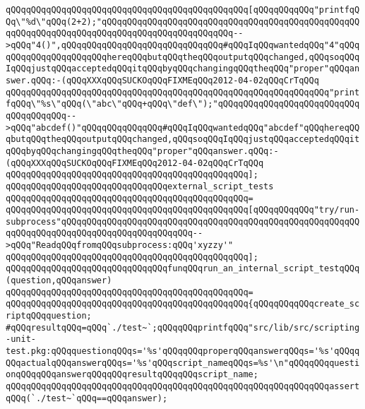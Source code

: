 \verb|qQQqqQQqqQQqqQQqqQQqqQQqqQQqqQQqqQQqqQQqqQQqqQQq[qQQqqQQqqQQq"printfqQQq\"%d\"qQQq(2+2);"qQQqqQQqqQQqqQQqqQQqqQQqqQQqqQQqqQQqqQQqqQQqqQQqqQQqqQQqqQQqqQQqqQQqqQQqqQQqqQQqqQQqqQQqqQQqqQQq-->qQQq"4()",qQQqqQQqqQQqqQQqqQQqqQQqqQQqqQQq#qQQqIqQQqwantedqQQq"4"qQQqqQQqqQQqqQQqqQQqqQQqhereqQQqbutqQQqtheqQQqoutputqQQqchanged,qQQqsoqQQqIqQQqjustqQQqacceptedqQQqitqQQqbyqQQqchangingqQQqtheqQQq"proper"qQQqanswer.qQQq:-(qQQqXXXqQQqSUCKOqQQqFIXMEqQQq2012-04-02qQQqCrTqQQq|\newline
\verb|qQQqqQQqqQQqqQQqqQQqqQQqqQQqqQQqqQQqqQQqqQQqqQQqqQQqqQQqqQQqqQQq"printfqQQq\"%s\"qQQq(\"abc\"qQQq+qQQq\"def\");"qQQqqQQqqQQqqQQqqQQqqQQqqQQqqQQqqQQqqQQq-->qQQq"abcdef()"qQQqqQQqqQQqqQQq#qQQqIqQQqwantedqQQq"abcdef"qQQqhereqQQqbutqQQqtheqQQqoutputqQQqchanged,qQQqsoqQQqIqQQqjustqQQqacceptedqQQqitqQQqbyqQQqchangingqQQqtheqQQq"proper"qQQqanswer.qQQq:-(qQQqXXXqQQqSUCKOqQQqFIXMEqQQq2012-04-02qQQqCrTqQQq|\newline
\verb|qQQqqQQqqQQqqQQqqQQqqQQqqQQqqQQqqQQqqQQqqQQqqQQq];|\newline
\newline
\verb|qQQqqQQqqQQqqQQqqQQqqQQqqQQqqQQqexternal_script_tests|\newline
\verb|qQQqqQQqqQQqqQQqqQQqqQQqqQQqqQQqqQQqqQQqqQQqqQQq=|\newline
\verb|qQQqqQQqqQQqqQQqqQQqqQQqqQQqqQQqqQQqqQQqqQQqqQQq[qQQqqQQqqQQq"try/run-subprocess"qQQqqQQqqQQqqQQqqQQqqQQqqQQqqQQqqQQqqQQqqQQqqQQqqQQqqQQqqQQqqQQqqQQqqQQqqQQqqQQqqQQqqQQqqQQqqQQq-->qQQq"ReadqQQqfromqQQqsubprocess:qQQq'xyzzy'"|\newline
\verb|qQQqqQQqqQQqqQQqqQQqqQQqqQQqqQQqqQQqqQQqqQQqqQQq];|\newline
\newline
\verb|qQQqqQQqqQQqqQQqqQQqqQQqqQQqqQQqfunqQQqrun_an_internal_script_testqQQq(question,qQQqanswer)|\newline
\verb|qQQqqQQqqQQqqQQqqQQqqQQqqQQqqQQqqQQqqQQqqQQqqQQq=|\newline
\verb|qQQqqQQqqQQqqQQqqQQqqQQqqQQqqQQqqQQqqQQqqQQqqQQq{qQQqqQQqqQQqcreate_scriptqQQqquestion;|\newline
\verb|#qQQqresultqQQq=qQQq`./test~`;qQQqqQQqprintfqQQq"src/lib/src/scripting-unit-test.pkg:qQQqquestionqQQqs='%s'qQQqqQQqproperqQQqanswerqQQqs='%s'qQQqqQQqactualqQQqanswerqQQqs='%s'qQQqscript_nameqQQqs=%s'\n"qQQqqQQqquestionqQQqqQQqanswerqQQqqQQqresultqQQqqQQqscript_name;|\newline
\verb|qQQqqQQqqQQqqQQqqQQqqQQqqQQqqQQqqQQqqQQqqQQqqQQqqQQqqQQqqQQqqQQqassertqQQq(`./test~`qQQq==qQQqanswer);|\newline
